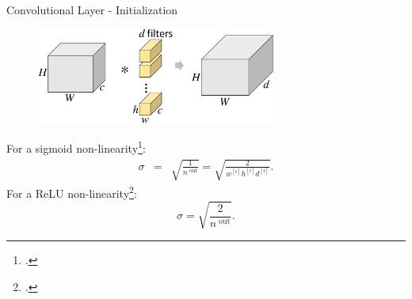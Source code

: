 \documentclass[t,xcolor=dvipsnames]{beamer}
\begin{document}
\begin{frame}{Convolutional Layer - Initialization}
\begin{figure}
\includegraphics[width=0.7\textwidth, page=1]{../Figs/PDF/sparsification}
\end{figure}
For a sigmoid non-linearity\footcite{glorot2010understanding}:
\begin{eqnarray*}
\sigma &=& \sqrt{\frac{1}{n^{\textrm{ out}}}} = \sqrt{\frac{2}{w^{[i]} h^{[i]} d^{[i]}}}.
\end{eqnarray*}
For a ReLU non-linearity\footcite{journals/corr/HeZR015}:
\begin{equation*}
\sigma = \sqrt{\frac{2}{n^{\textrm{ out}}}}.
\end{equation*}
\end{frame}


\renewcommand{\covarlabels}[5]{%
\begin{tikzpicture}[anchor=south west]
    \node [inner sep=0pt] (c)
    {
        #5
    };
    \ifx\covarwidth\undefined
    \newlength{\covarwidth}
    \newlength{\covarheight}
    \fi
    \settowidth{\covarwidth}{#5}
    \settoheight{\covarheight}{#5}
    \path[use as bounding box] (c.south west) rectangle (c.north east);
    \node [anchor=south west, xshift=-0.5em, yshift=-0.5em, rotate=45] at (c.north west) {\footnotesize 0};
    \node [anchor=south east, xshift=\covarwidth, yshift=-0.2em] at (c.north west) {\footnotesize #4};
    \node [anchor=south west, xshift=0.25em, yshift=-1.05\covarheight, rotate=90] at (c.north west) {\footnotesize #2};
    \node [anchor=south, xshift=0.5\covarwidth] at (c.north west) {\footnotesize\texttt{#3}};
    \node [anchor=south, xshift=0.2em, yshift=-0.5\covarheight, rotate=90] at (c.north west) {\footnotesize \texttt{#1}};
\end{tikzpicture}%
}
\end{document}
